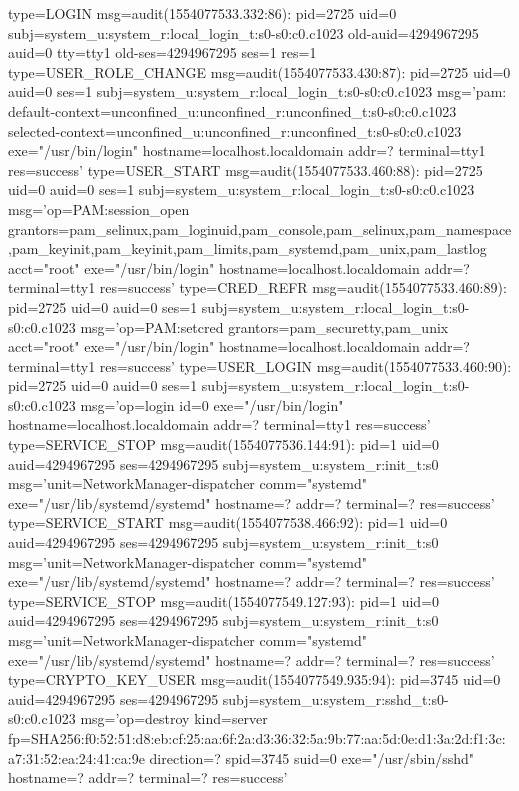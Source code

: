 \documentclass[]{report}
\newenvironment{Shaded}{}{}
\newcommand{\NormalTok}[1]{#1}
\begin{document}
\begin{Shaded}
\begin{Highlighting}[]
\NormalTok{type=LOGIN msg=audit(1554077533.332:86): pid=2725 uid=0 subj=system_u:system_r:local_login_t:s0-s0:c0.c1023 old-auid=4294967295 auid=0 tty=tty1 old-ses=4294967295 ses=1 res=1}
\NormalTok{type=USER_ROLE_CHANGE msg=audit(1554077533.430:87): pid=2725 uid=0 auid=0 ses=1 subj=system_u:system_r:local_login_t:s0-s0:c0.c1023 msg='pam: default-context=unconfined_u:unconfined_r:unconfined_t:s0-s0:c0.c1023 selected-context=unconfined_u:unconfined_r:unconfined_t:s0-s0:c0.c1023 exe="/usr/bin/login" hostname=localhost.localdomain addr=? terminal=tty1 res=success'}
\NormalTok{type=USER_START msg=audit(1554077533.460:88): pid=2725 uid=0 auid=0 ses=1 subj=system_u:system_r:local_login_t:s0-s0:c0.c1023 msg='op=PAM:session_open grantors=pam_selinux,pam_loginuid,pam_console,pam_selinux,pam_namespace,pam_keyinit,pam_keyinit,pam_limits,pam_systemd,pam_unix,pam_lastlog acct="root" exe="/usr/bin/login" hostname=localhost.localdomain addr=? terminal=tty1 res=success'}
\NormalTok{type=CRED_REFR msg=audit(1554077533.460:89): pid=2725 uid=0 auid=0 ses=1 subj=system_u:system_r:local_login_t:s0-s0:c0.c1023 msg='op=PAM:setcred grantors=pam_securetty,pam_unix acct="root" exe="/usr/bin/login" hostname=localhost.localdomain addr=? terminal=tty1 res=success'}
\NormalTok{type=USER_LOGIN msg=audit(1554077533.460:90): pid=2725 uid=0 auid=0 ses=1 subj=system_u:system_r:local_login_t:s0-s0:c0.c1023 msg='op=login id=0 exe="/usr/bin/login" hostname=localhost.localdomain addr=? terminal=tty1 res=success'}
\NormalTok{type=SERVICE_STOP msg=audit(1554077536.144:91): pid=1 uid=0 auid=4294967295 ses=4294967295 subj=system_u:system_r:init_t:s0 msg='unit=NetworkManager-dispatcher comm="systemd" exe="/usr/lib/systemd/systemd" hostname=? addr=? terminal=? res=success'}
\NormalTok{type=SERVICE_START msg=audit(1554077538.466:92): pid=1 uid=0 auid=4294967295 ses=4294967295 subj=system_u:system_r:init_t:s0 msg='unit=NetworkManager-dispatcher comm="systemd" exe="/usr/lib/systemd/systemd" hostname=? addr=? terminal=? res=success'}
\NormalTok{type=SERVICE_STOP msg=audit(1554077549.127:93): pid=1 uid=0 auid=4294967295 ses=4294967295 subj=system_u:system_r:init_t:s0 msg='unit=NetworkManager-dispatcher comm="systemd" exe="/usr/lib/systemd/systemd" hostname=? addr=? terminal=? res=success'}
\NormalTok{type=CRYPTO_KEY_USER msg=audit(1554077549.935:94): pid=3745 uid=0 auid=4294967295 ses=4294967295 subj=system_u:system_r:sshd_t:s0-s0:c0.c1023 msg='op=destroy kind=server fp=SHA256:f0:52:51:d8:eb:cf:25:aa:6f:2a:d3:36:32:5a:9b:77:aa:5d:0e:d1:3a:2d:f1:3c:a7:31:52:ea:24:41:ca:9e direction=? spid=3745 suid=0  exe="/usr/sbin/sshd" hostname=? addr=? terminal=? res=success'}

\end{Highlighting}
\end{Shaded}
\end{document}
